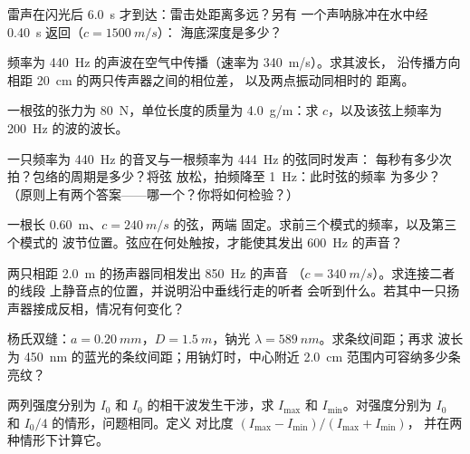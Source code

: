 \begin{exercise}[$\star$]\label{exo:b1:wave-propagation:1}
雷声在闪光后 \qty{6.0}{s} 才到达：雷击处距离多远？另有
一个声呐脉冲在水中经 \qty{0.40}{s} 返回（$c = \qty{1500}{m/s}$）：
海底深度是多少？
\end{exercise}

\begin{exercise}[$\star$]\label{exo:b1:wave-propagation:2}
频率为 \qty{440}{Hz} 的声波在空气中传播（速率为 \qty{340}{m/s}）。求其波长，
沿传播方向相距 \qty{20}{cm} 的两只传声器之间的相位差，
以及两点振动同相时的
距离。
\end{exercise}

\begin{exercise}[$\star$]\label{exo:b1:wave-propagation:3}
一根弦的张力为 \qty{80}{N}，单位长度的质量为
\qty{4.0}{g/m}：求 $c$，以及该弦上频率为 \qty{200}{Hz}
的波的波长。
\end{exercise}

\begin{exercise}[$\star$]\label{exo:b1:wave-propagation:4}
一只频率为 \qty{440}{Hz} 的音叉与一根频率为 \qty{444}{Hz} 的弦同时发声：
每秒有多少次拍？包络的周期是多少？将弦
放松，拍频降至 \qty{1}{Hz}：此时弦的频率
为多少？（原则上有两个答案——哪一个？你将如何检验？）
\end{exercise}

\begin{exercise}[$\star\star$]\label{exo:b1:wave-propagation:5}
一根长 \qty{0.60}{m}、$c = \qty{240}{m/s}$ 的弦，两端
固定。求前三个模式的频率，以及第三个模式的
波节位置。弦应在何处触按，才能使其发出
\qty{600}{Hz} 的声音？
\end{exercise}

\begin{exercise}[$\star\star$]\label{exo:b1:wave-propagation:6}
两只相距 \qty{2.0}{m} 的扬声器同相发出 \qty{850}{Hz} 的声音
（$c = \qty{340}{m/s}$）。求连接二者的线段
上静音点的位置，并说明沿中垂线行走的听者
会听到什么。若其中一只扬声器接成反相，情况有何变化？
\end{exercise}

\begin{exercise}[$\star\star$]\label{exo:b1:wave-propagation:7}
杨氏双缝：$a = \qty{0.20}{mm}$，$D = \qty{1.5}{m}$，钠光
$\lambda = \qty{589}{nm}$。求条纹间距；再求
波长为 \qty{450}{nm} 的蓝光的条纹间距；用钠灯时，中心附近
\qty{2.0}{cm} 范围内可容纳多少条亮纹？
\end{exercise}

\begin{exercise}[$\star\star$]\label{exo:b1:wave-propagation:8}
两列强度分别为 $I_0$ 和 $I_0$ 的相干波发生干涉，求
$I_{\max}$ 和 $I_{\min}$。对强度分别为 $I_0$ 和 $I_0/4$ 的情形，问题相同。定义
对比度 $(I_{\max} - I_{\min})/(I_{\max} + I_{\min})$，
并在两种情形下计算它。
\end{exercise}

